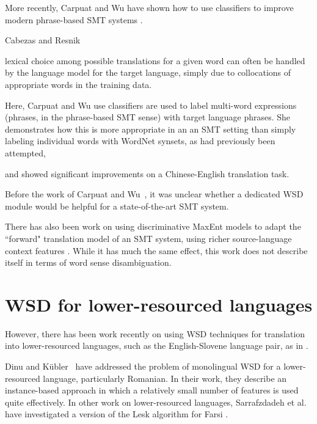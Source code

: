 
More recently, Carpuat and Wu have shown how to use classifiers to improve
modern phrase-based SMT systems
\cite{carpuatpsd,carpuat-wu:2007:EMNLP-CoNLL2007,carpuat2008evaluation}.

Cabezas and Resnik
\cite{cabezas2005using}

lexical choice among possible translations for a given word can
often be handled by the language model for the target language, simply due to
collocations of appropriate words in the training data.

Here, Carpuat and Wu use classifiers are used to label multi-word expressions
(phrases, in the phrase-based SMT sense) with target language phrases.
She demonstrates
how this is more appropriate in an an SMT setting than simply labeling
individual words with WordNet synsets, as had previously been attempted,

and showed significant improvements on a Chinese-English translation task.

Before the work of Carpuat and Wu~\cite{improvingsmtwsd}, it was
unclear whether a dedicated WSD module would be helpful for a state-of-the-art 
SMT system.

There has also been work on using discriminative MaxEnt models to adapt
the ``forward" translation model of an SMT system, using richer
source-language context features \cite{vzabokrtsky-popel-marevcek:2010:WMT}.
While it has much the same effect, this work does not describe itself in terms
of word sense disambiguation.



\section{WSD for lower-resourced languages}
However, there has been work recently on using WSD techniques for translation
into lower-resourced languages, such as the English-Slovene language pair, as
in \cite{vintar-fivser-vrvsvcaj:2012:ESIRMT-HyTra2012}. 

Dinu and Kübler~\cite{Dinu07} have addressed the problem of monolingual WSD for
a lower-resourced language, particularly Romanian. In their work, they describe
an instance-based approach in which a relatively small number of features is
used quite effectively. In other work on lower-resourced languages,
Sarrafzdadeh et al. have investigated a version of the Lesk algorithm
for Farsi \cite{sarrafzdadeh}.


